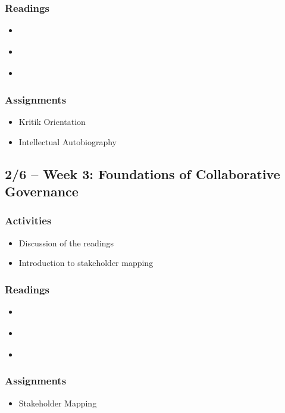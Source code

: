 \documentclass[12pt, letterpaper]{article}
\begin{document}
    \subsubsection*{Readings}
        \begin{itemize}
            \item \citet[chapter 1]{Agranoff2012}
            \item \citet[chapter 1]{Agranoff2023}
            \item \citet[chapter 1]{Henderson2015}
        \end{itemize}
    \subsubsection*{Assignments}
        \begin{itemize}
            \item Kritik Orientation
            \item Intellectual Autobiography
        \end{itemize}

\subsection*{2/6 -- Week 3: Foundations of Collaborative Governance}
    \subsubsection*{Activities}
        \begin{itemize}
            \item Discussion of the readings
            \item Introduction to stakeholder mapping
        \end{itemize}
    \subsubsection*{Readings}
        \begin{itemize}
            \item \citet[chapter 2]{Agranoff2023}
            \item \citet[chapter 1]{Bingham2008}
            \item \citet[chapter 2]{Henderson2015}
        \end{itemize}
    \subsubsection*{Assignments}
        \begin{itemize}
            \item Stakeholder Mapping
        \end{itemize}
\end{document}
